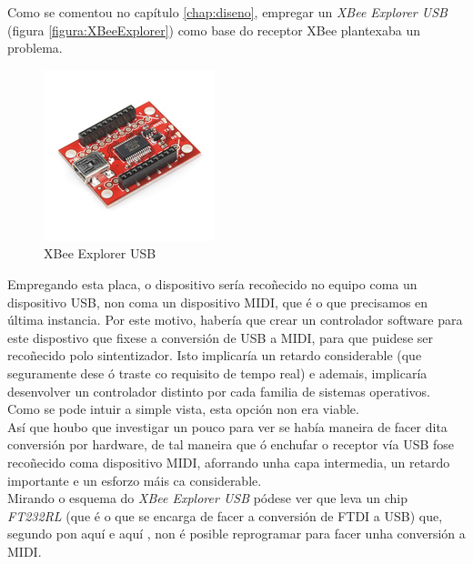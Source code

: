     Como se comentou no capítulo \ref{chap:diseno}, empregar un
    \textit{XBee Explorer USB} \cite{XBeeExplorer} (figura
    \ref{figura:XBeeExplorer}) como base do receptor XBee plantexaba un
    problema.

    \begin{figure}[htbp]
     \centering
     \includegraphics[scale=3.0,keepaspectratio=true]{./imagenes/xbee-explorer.jpg}
     \caption{XBee Explorer USB}
     \label{figura:XBeeExplorer2}
    \end{figure}

    Empregando esta placa, o dispositivo sería recoñecido no equipo coma un
    dispositivo USB, non coma un dispositivo MIDI, que é o que precisamos en
    última instancia. Por este motivo, habería que crear un controlador
    software para este dispostivo que fixese a conversión de USB a MIDI, para
    que puidese ser recoñecido polo sintentizador. Isto implicaría un retardo
    considerable (que seguramente dese ó traste co requisito de tempo real) e
    ademais, implicaría desenvolver un controlador distinto por cada familia de
    sistemas operativos. Como se pode intuir a simple vista, esta opción non
    era viable. \\

    Así que houbo que investigar un pouco para ver se había maneira de facer
    dita conversión por hardware, de tal maneira que ó enchufar o receptor vía
    USB fose recoñecido coma dispositivo MIDI, aforrando unha capa intermedia,
    un retardo importante e un esforzo máis ca considerable. \\

    Mirando o esquema do \textit{XBee Explorer USB} pódese ver que leva un chip
    \textit{FT232RL} (que é o que se encarga de facer a conversión de FTDI a
    USB) que, segundo pon aquí \cite{FT232RL} e aquí \cite{Moco}, non é posible
    reprogramar para facer unha conversión a MIDI. \\

